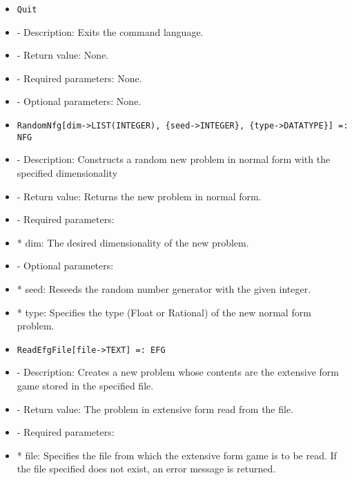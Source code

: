 \begin{itemize}
\item

\begin{verbatim}
Quit
\end{verbatim}

\bd

\item
- Description:  Exits the command language.
\item
- Return value:  None.
\item
- Required parameters:  None.
\item
- Optional parameters:  None.
\ed

\item

\begin{verbatim}
RandomNfg[dim->LIST(INTEGER), {seed->INTEGER}, {type->DATATYPE}] =: NFG
\end{verbatim}

\bd
\item
- Description:  Constructs a random new problem in normal form with the 
specified dimensionality
\item
- Return value:  Returns the new problem in normal form.
\item
- Required parameters:
	
\bd
\item
*  dim:  The desired dimensionality of the new problem.
\ed

\item
- Optional parameters:
	
\bd
\item
*  seed:  Reseeds the random number generator with the given integer.
\item

*  type:  Specifies the type (Float or Rational) of the new normal 
form problem.
\ed
\ed

\item
\begin{verbatim}
ReadEfgFile[file->TEXT] =: EFG
\end{verbatim}

\bd
\item
- Description:  Creates a new problem whose contents are the extensive 
form game stored in the specified file.
\item
- Return value:  The problem in extensive form read from the file.
\item

- Required parameters:

\bd
\item
*  file:  Specifies the file from which the extensive form game is to
be read.  If the file specified does not exist, an error 
message is returned.
\ed


\end{itemize}
